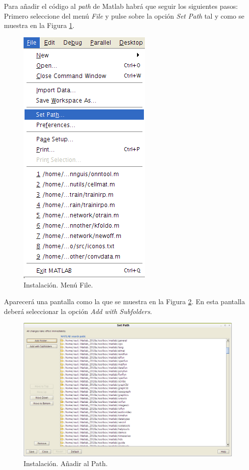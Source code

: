 			Para añadir el código al \textit{path} de Matlab habrá que seguir los siguientes pasos:\\
			
			Primero seleccione del menú \textit{File} y pulse sobre la opción \textit{Set Path} tal y como se muestra en la Figura \ref{fig:menu}.\\
			
			\begin{figure}[htbp]
				\centering
				\includegraphics[scale=0.6]{img/menu.png}
				\caption{Instalación. Menú File.}
				\label{fig:menu}
			\end{figure}
			
			Aparecerá una pantalla como la que se muestra en la Figura \ref{fig:path}. En esta pantalla deberá seleccionar la opción \textit{Add with Subfolders}.\\
			
			\begin{figure}[htbp]
				\centering
				\includegraphics[scale=0.4]{img/path.png}
				\caption{Instalación. Añadir al Path.}
				\label{fig:path}
			\end{figure}
			
